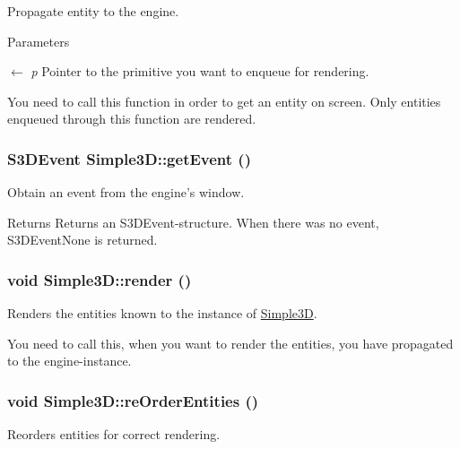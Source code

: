 Propagate entity to the engine. 


\begin{DoxyParams}{Parameters}
\item[\mbox{$\leftarrow$} {\em p}]Pointer to the primitive you want to enqueue for rendering.\end{DoxyParams}
You need to call this function in order to get an entity on screen. Only entities enqueued through this function are rendered. \hypertarget{class_simple3_d_a8f6621e3e0b4bfae3011514e7fc73003}{
\subsubsection[{getEvent}]{\setlength{\rightskip}{0pt plus 5cm}S3DEvent Simple3D::getEvent ()}}
\label{class_simple3_d_a8f6621e3e0b4bfae3011514e7fc73003}


Obtain an event from the engine's window. 

\begin{DoxyReturn}{Returns}
Returns an S3DEvent-\/structure. When there was no event, S3DEventNone is returned. 
\end{DoxyReturn}
\hypertarget{class_simple3_d_ab98d8b6cfb6abf91b43a035ab36f75f8}{
\subsubsection[{render}]{\setlength{\rightskip}{0pt plus 5cm}void Simple3D::render ()}}
\label{class_simple3_d_ab98d8b6cfb6abf91b43a035ab36f75f8}


Renders the entities known to the instance of \hyperlink{class_simple3_d}{Simple3D}. 

You need to call this, when you want to render the entities, you have propagated to the engine-\/instance. \hypertarget{class_simple3_d_aa0da52599eafb396ec36e3d0cf6da504}{
\subsubsection[{reOrderEntities}]{\setlength{\rightskip}{0pt plus 5cm}void Simple3D::reOrderEntities ()}}
\label{class_simple3_d_aa0da52599eafb396ec36e3d0cf6da504}


Reorders entities for correct rendering. 

